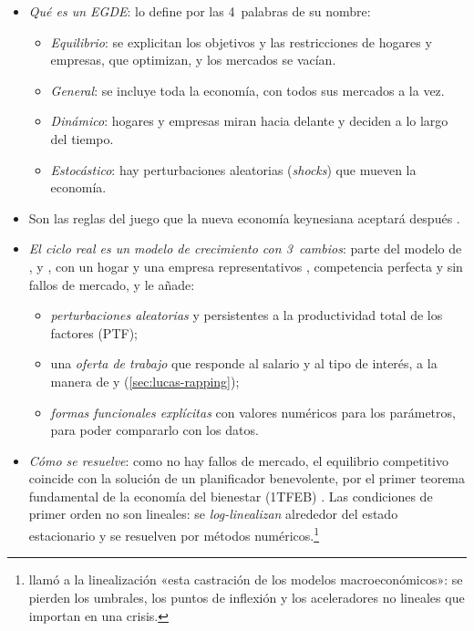 \documentclass[11pt]{article}
\begin{document}
\begin{itemize}
\item \emph{Qué es un EGDE}: \textcite{Kocherlakota2010Modern} lo define por las 4~palabras de su nombre:
  \begin{itemize}
  \item \emph{Equilibrio}: se explicitan los objetivos y las restricciones de hogares y empresas, que optimizan, y los mercados se vacían.
  \item \emph{General}: se incluye toda la economía, con todos sus mercados a la vez.
  \item \emph{Dinámico}: hogares y empresas miran hacia delante y deciden a lo largo del tiempo.
  \item \emph{Estocástico}: hay perturbaciones aleatorias (\emph{shocks}) que mueven la economía.
  \end{itemize}
\item Son las reglas del juego que la nueva economía keynesiana aceptará después .
\item \emph{El ciclo real es un modelo de crecimiento con 3~cambios}: parte del modelo de ,  y  , con un hogar y una empresa representativos , competencia perfecta y sin fallos de mercado, y le añade:
  \begin{itemize}
  \item \emph{perturbaciones aleatorias} y persistentes a la productividad total de los factores (PTF);
  \item una \emph{oferta de trabajo} que responde al salario y al tipo de interés, a la manera de  y  (\ref{sec:lucas-rapping});
  \item \emph{formas funcionales explícitas} con valores numéricos para los parámetros, para poder compararlo con los datos.
  \end{itemize}
\item \emph{Cómo se resuelve}: como no hay fallos de mercado, el equilibrio competitivo coincide con la solución de un planificador benevolente, por el primer teorema fundamental de la economía del bienestar (1TFEB) . Las condiciones de primer orden no son lineales: se \emph{log-linealizan} alrededor del estado estacionario y se resuelven por métodos numéricos.\footnote{\textcite{Buiter2009Unfortunate} llamó a la linealización «esta castración de los modelos macroeconómicos»: se pierden los umbrales, los puntos de inflexión y los aceleradores no lineales que importan en una crisis.}

\end{itemize}
\end{document}
